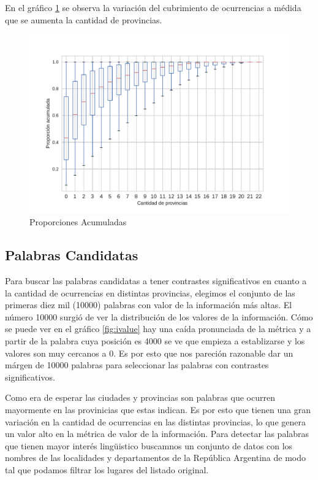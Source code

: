 En el gráfico \ref{fig:propAcum5000} se observa la variación del cubrimiento de ocurrencias a médida que se aumenta la cantidad de provincias. 


\begin{figure}[]
\centering
\includegraphics[width=1.0\textwidth]{./images/PropAcum5000.pdf}
\caption{Proporciones Acumuladas} 
\label{fig:propAcum5000} 
\end{figure}

\subsection{Palabras Candidatas} %
\label{sub:palabras_candidatas}
Para buscar las palabras candidatas a tener contrastes significativos en cuanto a la cantidad de ocurrencias en distintas provincias, elegimos el conjunto de las primeras 
diez mil (10000) palabras con valor de la información más altas. El número 10000 surgió de ver la distribución de los valores de la información. Cómo se puede ver en 
el gráfico \ref{fig:ivalue} hay una caída pronunciada de la métrica y a partir de la palabra cuya posición es 4000 se ve que empieza a establizarse y los valores son 
muy cercanos a 0. Es por esto que nos pareción razonable dar un márgen de 10000 palabras para seleccionar las palabras con contrastes significativos.


Como era de esperar las ciudades y provincias son palabras que ocurren mayormente en las provinicias que estas indican. Es por esto que tienen una gran variación en 
la cantidad de ocurrencias en las distintas provincias, lo que genera un valor alto en la métrica de valor de la información. Para detectar las palabras que tienen 
mayor interés lingüistico buscamnos un conjunto de datos con los nombres de las localidades y departamentos de la República Argentina de modo tal que podamos filtrar 
los lugares del listado original.


